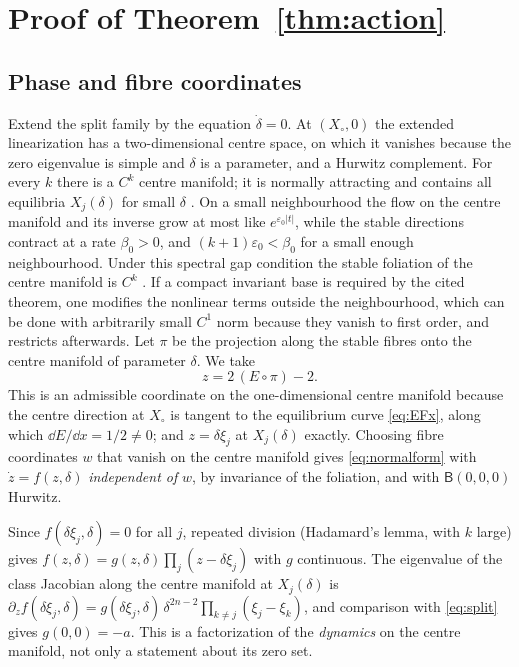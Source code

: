 \section{Proof of Theorem~\ref{thm:action}}\label{app:action}

\subsection{Phase and fibre coordinates}
Extend the split family by the equation \(\dot\delta=0\). At \((X_\circ,0)\) the extended
linearization has a two-dimensional centre space, on which it vanishes because the zero
eigenvalue is simple and \(\delta\) is a parameter, and a Hurwitz complement. For every \(k\)
there is a \(C^k\) centre manifold; it is normally attracting and contains all equilibria
\(X_j(\delta)\) for small \(\delta\) \cite{Carr1981}. On a small neighbourhood the flow on the
centre manifold and its inverse grow at most like \(e^{\varepsilon_0|t|}\), while the stable
directions contract at a rate \(\beta_0>0\), and \((k+1)\varepsilon_0<\beta_0\) for a small
enough neighbourhood. Under this spectral gap condition the stable foliation of the centre
manifold is \(C^k\) \cite{Fenichel1979,HirschPughShub1977,ElderingKvalheimRevzen2018}. If a
compact invariant base is required by the cited theorem, one modifies the nonlinear terms
outside the neighbourhood, which can be done with arbitrarily small \(C^1\) norm because they
vanish to first order, and restricts afterwards. Let \(\pi\) be the projection along the stable
fibres onto the centre manifold of parameter \(\delta\). We take
\[
 z=2\,(E\circ\pi)-2 .
\]
This is an admissible coordinate on the one-dimensional centre manifold because the centre
direction at \(X_\circ\) is tangent to the equilibrium curve \eqref{eq:EFx}, along which
\(\dd E/\dd x=1/2\ne0\); and \(z=\delta\xi_j\) at \(X_j(\delta)\) exactly. Choosing fibre
coordinates \(w\) that vanish on the centre manifold gives \eqref{eq:normalform} with
\(\dot z=f(z,\delta)\) \emph{independent of} \(w\), by invariance of the foliation, and with
\(\mathsf B(0,0,0)\) Hurwitz.

Since \(f(\delta\xi_j,\delta)=0\) for all \(j\), repeated division (Hadamard's lemma, with
\(k\) large) gives \(f(z,\delta)=g(z,\delta)\prod_j(z-\delta\xi_j)\) with \(g\) continuous.
The eigenvalue of the class Jacobian along the centre manifold at \(X_j(\delta)\) is
\(\partial_zf(\delta\xi_j,\delta)=g(\delta\xi_j,\delta)\,\delta^{2n-2}\prod_{k\ne j}(\xi_j-\xi_k)\),
and comparison with \eqref{eq:split} gives \(g(0,0)=-a\). This is a factorization of the
\emph{dynamics} on the centre manifold, not only a statement about its zero set.

